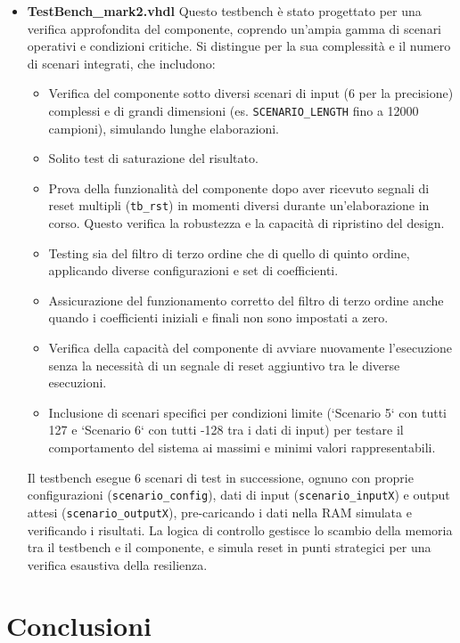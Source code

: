 \documentclass{article}
\begin{document}
\begin{itemize}
    \item \textbf{TestBench\_mark2.vhdl}
    Questo testbench è stato progettato per una verifica approfondita del componente, coprendo un'ampia gamma di scenari operativi e condizioni critiche. Si distingue per la sua complessità e il numero di scenari integrati, che includono:
    \begin{itemize}
        \item Verifica del componente sotto diversi scenari di input (6 per la precisione) complessi e di grandi dimensioni (es. \texttt{SCENARIO\_LENGTH} fino a 12000 campioni), simulando lunghe elaborazioni.
        \item Solito test di saturazione del risultato.
        \item Prova della funzionalità del componente dopo aver ricevuto segnali di reset multipli (\texttt{tb\_rst}) in momenti diversi durante un'elaborazione in corso. Questo verifica la robustezza e la capacità di ripristino del design.
        \item Testing sia del filtro di terzo ordine che di quello di quinto ordine, applicando diverse configurazioni e set di coefficienti.
        \item Assicurazione del funzionamento corretto del filtro di terzo ordine anche quando i coefficienti iniziali e finali non sono impostati a zero.
        \item Verifica della capacità del componente di avviare nuovamente l'esecuzione senza la necessità di un segnale di reset aggiuntivo tra le diverse esecuzioni.
        \item Inclusione di scenari specifici per condizioni limite (`Scenario 5` con tutti 127 e `Scenario 6` con tutti -128 tra i dati di input) per testare il comportamento del sistema ai massimi e minimi valori rappresentabili.
    \end{itemize}
    Il testbench esegue 6 scenari di test in successione, ognuno con proprie configurazioni (\texttt{scenario\_config}), dati di input (\texttt{scenario\_inputX}) e output attesi (\texttt{scenario\_outputX}), pre-caricando i dati nella RAM simulata e verificando i risultati. La logica di controllo gestisce lo scambio della memoria tra il testbench e il componente, e simula reset in punti strategici per una verifica esaustiva della resilienza.
\end{itemize}

\section{Conclusioni}
\end{document}
